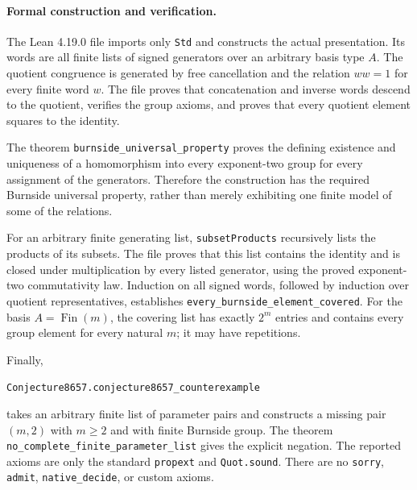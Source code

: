 \documentclass[11pt]{article}
\begin{document}
\newpage
\paragraph{Formal construction and verification.}
The Lean 4.19.0 file imports only \texttt{Std} and constructs the actual
presentation.  Its words are all finite lists of signed generators over an
arbitrary basis type $A$.  The quotient congruence is generated by free
cancellation and the relation $ww=1$ for every finite word $w$.  The file
proves that concatenation and inverse words descend to the quotient, verifies
the group axioms, and proves that every quotient element squares to the
identity.

The theorem \texttt{burnside\_\allowbreak{}universal\_\allowbreak{}property} proves the defining
existence and uniqueness of a homomorphism into every exponent-two group
for every assignment of the generators.  Therefore the construction has
the required Burnside universal property, rather than merely exhibiting one
finite model of some of the relations.

For an arbitrary finite generating list, \texttt{subsetProducts} recursively
lists the products of its subsets.  The file proves that this list contains
the identity and is closed under multiplication by every listed generator,
using the proved exponent-two commutativity law.  Induction on all signed
words, followed by induction over quotient representatives, establishes
\texttt{every\_\allowbreak{}burnside\_\allowbreak{}element\_\allowbreak{}covered}.  For the basis
$A=\operatorname{Fin}(m)$, the covering list has exactly $2^m$ entries and
contains every group element for every natural $m$; it may have repetitions.

Finally,
\begin{center}
\texttt{Conjecture8657.conjecture8657\_counterexample}
\end{center}
takes an arbitrary finite list of parameter pairs and constructs a missing
pair $(m,2)$ with $m\ge2$ and with finite Burnside group.
The theorem \texttt{no\_\allowbreak{}complete\_\allowbreak{}finite\_\allowbreak{}parameter\_\allowbreak{}list} gives the explicit
negation.  The reported axioms are only the standard \texttt{propext} and
\texttt{Quot.sound}.  There are no \texttt{sorry}, \texttt{admit},
\texttt{native\_decide}, or custom axioms.
\end{document}
